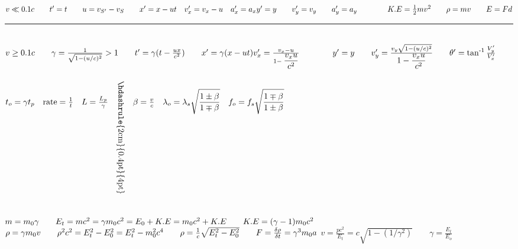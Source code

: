 \documentclass[a4paper,12pt]{article}
\newcommand{\sz}{\text{-}}
\begin{document}

\fontsize{13}{16}\selectfont

\noindent
$
v \ll 0.1c \qquad t^\prime = t \qquad u = v_{S^\prime} - v_S \qquad x^\prime = x - ut \quad v^\prime_x = v_x - u \quad a_x^\prime = a_x \\[+2mm]
y^\prime = y \qquad v^\prime_y = v_y \qquad a_y^\prime = a_y \qquad \qquad K.E = \frac{1}{2} mv^2 \qquad \rho = mv \qquad E = F d
$

{\centering \rule{10cm}{0.4pt} \par}

\ \\
\noindent
$
v \ge 0.1c \qquad \gamma = \frac{1}{\sqrt{1- (u/c)^2}} > 1 \qquad t^\prime = \gamma (t - \frac{ux}{c^2}) \qquad
x^\prime = \gamma(x - ut)\\ v^\prime_x = \frac{v_x - u}{1 - \displaystyle \frac{v_x u}{c^2} } \qquad \qquad  y^\prime = y \qquad v^\prime_y = \frac{v_y \sqrt{1-(u/c)^2}}{\displaystyle 1- \frac{v_x u}{c^2}} \qquad \theta^\prime = \tan^{\sz 1}{\frac{V_y^\prime}{V_x^\prime}} \\[-3mm]
$

{\centering \hdashrule{10cm}{0.4pt}{4pt} \par}

\ \\
\noindent
$ t_o = \gamma t_p \quad \text{rate} = \frac{1}{t} \quad L = \frac{L_p}{\gamma} \quad \rotatebox{-90}{\hskip-1cm\hdashrule{2cm}{0.4pt}{4pt}} \quad
\beta = \frac{v}{c} \quad \lambda_o = \lambda_s \displaystyle \sqrt{\frac{1\pm \beta}{1\mp \beta}} \quad f_o = f_s \displaystyle \sqrt{\frac{1\mp \beta}{1\pm \beta}}\\[-1em]
$

{\centering \hdashrule{10cm}{0.4pt}{4pt} \par}

\ \\
\noindent
$ m = m_0 \gamma \qquad E_t = mc^2 = \gamma m_0c^2 = E_0 + K.E = m_0c^2 + K.E \qquad K.E = (\gamma - 1) m_0c^2 \\[+2mm]$
$\rho = \gamma m_0v \qquad \rho^2c^2 = E_t^2 - E_0^2 = E_t^2 - m_0^2c^4 \qquad \rho = \frac{1}{c} \sqrt{E_t^2 - E_0^2} \qquad F = \frac{\delta \rho}{\delta t} = \gamma^3 m_0 a\\[+2mm]$
$v = \frac{p c^2}{E_t} = c \sqrt{1- (1/\gamma^2)} \qquad \gamma = \frac{E_t}{E_o}$
\end{document}
